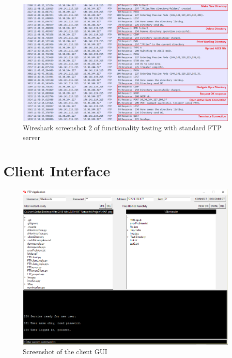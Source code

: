 \documentclass[10pt,twocolumn]{witseiepaper}
\begin{document}
\begin{appendix}
\begin{figure}[h]
\centering
\includegraphics[width=0.9\columnwidth]{WitsServerCapture2.png}
\caption{Wireshark screenshot 2 of functionality testing with standard FTP server}
\raggedright
\label{fig:WitsWS2}
\end{figure}

\newpage

\section{Client Interface}\label{sec:GUIAppendix}
\begin{figure}[h]
\centering
\includegraphics[width=0.9\columnwidth]{interface.png}
\caption{Screenshot of the client GUI}
\raggedright
\label{fig:ClientGUI}
\end{figure}

\end{appendix}

\end{document}

